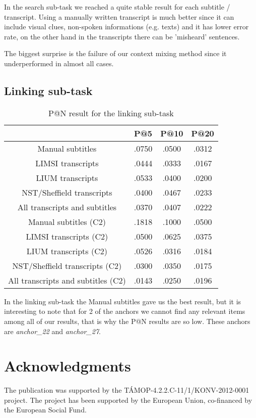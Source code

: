 \documentclass{acm_proc_article-me}
\begin{document}
In the search sub-task we reached a quite stable result for each subtitle / transcript. Using a manually written transcript is much better since it can include visual clues, non-spoken informations (e.g. texts) and it has lower error rate, on the other hand in the transcripts there can be 'misheard' sentences. 

The biggest surprise is the failure of our context mixing method since it underperformed in almost all cases.

\subsection{Linking sub-task}

\begin{table}[h]
\begin{tabular}{|c|c|c|c|}
	\hline 
	& P@5 & P@10 & P@20\tabularnewline
	\hline 
	\hline 
	Manual subtitles & .0750 & .0500 & .0312\tabularnewline
	\hline 
	LIMSI transcripts & .0444 & .0333 & .0167\tabularnewline
	\hline 
	LIUM transcripts & .0533 & .0400 & .0200\tabularnewline
	\hline 
	NST/Sheffield transcripts & .0400 & .0467 & .0233\tabularnewline
	\hline 
	All transcripts and subtitles & .0370 & .0407 & .0222\tabularnewline
	\hline 
	Manual subtitles (C2) & .1818 & .1000 & .0500\tabularnewline
	\hline 
	LIMSI transcripts (C2) & .0500 & .0625 & .0375\tabularnewline
	\hline 
	LIUM transcripts (C2) & .0526 & .0316 & .0184\tabularnewline
	\hline 
	NST/Sheffield transcripts (C2) & .0300 & .0350 & .0175\tabularnewline	
	\hline 
	All transcripts and subtitles (C2) & .0143 & .0250 & .0196\tabularnewline	
	\hline 
\end{tabular}
\caption{P@N result for the linking sub-task}
\end{table}

In the linking sub-task the Manual subtitles gave us the best result, but it is interesting to note that for 2 of the anchors we cannot find any relevant items among all of our results, that is why the P@N results are so low. These anchors are \textit{anchor\_22} and \textit{anchor\_27}.


\section{Acknowledgments}

The publication was supported by the T\'AMOP-4.2.2.C-11/1/KONV-2012-0001 project. The project has been supported by the European Union, co-financed by the European Social Fund.



\end{document}
